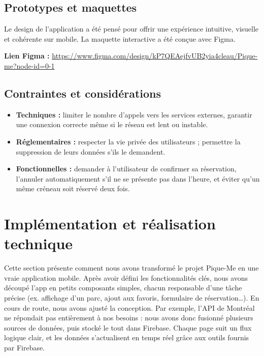 \documentclass[12pt,a4paper]{article}
\begin{document}
\subsection{Prototypes et maquettes}

Le design de l'application a été pensé pour offrir une expérience intuitive, visuelle et cohérente sur mobile. La maquette interactive a été conçue avec Figma.

\vspace{0.5em}
\noindent\textbf{Lien Figma :} \url{https://www.figma.com/design/kP7QEAejfvUB2yia4cleau/Pique-me?node-id=0-1}

\subsection{Contraintes et considérations}

\begin{itemize}
  \item \textbf{Techniques :} limiter le nombre d'appels vers les services externes, garantir une connexion correcte même si le réseau est lent ou instable.
  \item \textbf{Réglementaires :} respecter la vie privée des utilisateurs ; permettre la suppression de leurs données s'ils le demandent.
  \item \textbf{Fonctionnelles :} demander à l'utilisateur de confirmer sa réservation, l'annuler automatiquement s'il ne se présente pas dans l'heure, et éviter qu'un même créneau soit réservé deux fois.
\end{itemize}


\section{Implémentation et réalisation technique}

Cette section présente comment nous avons transformé le projet Pique-Me en une vraie application mobile.
Après avoir défini les fonctionnalités clés, nous avons découpé l'app en petits composants simples, chacun responsable d'une tâche précise (ex. affichage d'un parc, ajout aux favoris, formulaire de réservation…).
En cours de route, nous avons ajusté la conception. Par exemple, l'API de Montréal ne répondait pas entièrement à nos besoins : nous avons donc fusionné plusieurs sources de données, puis stocké le tout dans Firebase.
Chaque page suit un flux logique clair, et les données s'actualisent en temps réel grâce aux outils fournis par Firebase.
\end{document}
